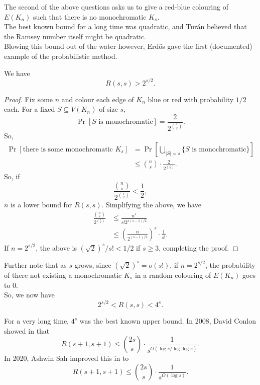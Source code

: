 	 The second of the above questions asks us to give a red-blue colouring of $E(K_n)$ such that there is no monochromatic $K_s$.\\
	 The best known bound for a long time was quadratic, and Tur\'{a}n believed that the Ramsey number itself might be quadratic.\\

	 Blowing this bound out of the water however, Erd\H{o}s gave the first (documented) example of the probabilistic method.

	 \begin{ftheo}
	 	We have
	 	\[ R(s,s) > 2^{s/2}. \]
	 \end{ftheo}
	 \begin{proof}
	 	Fix some $n$ and colour each edge of $K_n$ blue or red with probability $1/2$ each. For a fixed $S \subseteq V(K_n)$ of size $s$,
	 	\[ \Pr[S\text{ is monochromatic}] = \frac{2}{2^{\binom{s}{2}}}. \]
	 	So,
	 	\begin{align*}
	 		\Pr[\text{there is some monochromatic $K_s$}] &= \Pr\left[ \bigcup_{|S|=s} \{S\text{ is monochromatic}\} \right] \\
	 			&\le \binom{n}{s} \cdot \frac{2}{2^{\binom{s}{2}}}.
	 	\end{align*}
	 	So, if
	 	\[ \frac{\binom{n}{s}}{2^{\binom{s}{2}}} < \frac{1}{2}, \]
	 	$n$ is a lower bound for $R(s,s)$. Simplifying the above, we have
	 	\begin{align*}
	 		\frac{\binom{n}{s}}{2^{\binom{s}{2}}} &\le \frac{n^s}{s! 2^{s(s-1)/2}} \\
	 			&\le \left(\frac{n}{2^{(s-1)/2}}\right)^s \cdot \frac{1}{s!}.
	 	\end{align*}
	 	If $n = 2^{s/2}$, the above is $(\sqrt{2})^s / s! < 1/2$ if $s \ge 3$, completing the proof. 
	 \end{proof}

	 Further note that as $s$ grows, since $(\sqrt{2})^s = o(s!)$, if $n = 2^{s/2}$, the probability of there not existing a monochromatic $K_s$ in a random colouring of $E(K_n)$ goes to $0$.\\
	 So, we now have
	 \[ 2^{s/2} < R(s,s) < 4^s. \]

	 For a very long time, $4^s$ was the best known upper bound. In 2008, David Conlon showed in \cite{conlonRamsey} that
	 \[ R(s+1,s+1) \le \binom{2s}{s} \cdot \frac{1}{s^{O(\log s / \log \log s)}}. \]
	 In 2020, Ashwin Sah improved this in \cite{sahRamsey} to
	 \[ R(s+1,s+1) \le \binom{2s}{s} \cdot \frac{1}{s^{O(\log s)}}. \]


